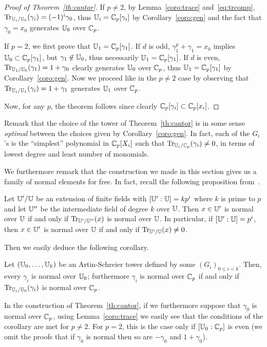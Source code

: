 \begin{proof}[Proof of Theorem~\ref{th:cantor}]
  If $p\ne2$, by Lemma~\ref{coro:trace} and~\ref{eq:trcomp},
  $\operatorname{Tr}_{\mathbb{U}_i/\mathbb{U}_0}(\gamma_i) = (-1)^i\gamma_0$, thus
  $\mathbb{U}_i=\mathbb{C}_p[\gamma_i]$ by Corollary~\ref{coro:gen} and the fact that
  $\gamma_0 = x_0$ generates $\mathbb{U}_0$ over $\mathbb{C}_p$.

  If $p=2$, we first prove that $\mathbb{U}_1=\mathbb{C}_p[\gamma_1]$.  If $d$ is odd,
  $\gamma_1^p + \gamma_1 = x_0$ implies $\mathbb{U}_0\subset\mathbb{C}_p[\gamma_1]$,
  but $\gamma_1\not\in\mathbb{U}_0$, thus necessarily $\mathbb{U}_1=\mathbb{C}_p[\gamma_1]$.
  If $d$ is even, $\operatorname{Tr}_{\mathbb{U}_1/\mathbb{U}_0}(\gamma_1)=1+\gamma_0$ clearly
  generates $\mathbb{U}_0$ over $\mathbb{C}_p$, thus $\mathbb{U}_1=\mathbb{C}_p[\gamma_1]$ by
  Corollary~\ref{coro:gen}. Now we proceed like in the $p\ne2$ case
  by observing that $\operatorname{Tr}_{\mathbb{U}_i/\mathbb{U}_1}(\gamma_i)=1+\gamma_1$ generates
  $\mathbb{U}_1$ over $\mathbb{C}_p$.

  Now, for any $p$, the theorem follows since clearly
  $\mathbb{C}_p[\gamma_i]\subset\mathbb{C}_p[x_i]$.
\end{proof}

Remark that the choice of the tower of Theorem~\ref{th:cantor} is in
some sense \emph{optimal} between the choices given by
Corollary~\ref{coro:gen}. In fact, each of the $G_i$'s is the
``simplest'' polynomial in $\mathbb{C}_p[X_i]$ such that
$\operatorname{Tr}_{\mathbb{U}_i/\mathbb{C}_p}(\gamma_i)\ne0$, in terms of lowest degree and least
number of monomials.

We furthermore remark that the construction we made in this section
gives us a family of normal elements for free. In fact, recall the
following proposition from~\cite[Section 5]{Hach}.
\begin{proposition}
  Let $\mathbb{U}'/\mathbb{U}$ be an extension of finite fields with $[\mathbb{U}':\mathbb{U}]=kp^i$
  where $k$ is prime to $p$ and let $\mathbb{U}''$ be the intermediate field
  of degree $k$ over $\mathbb{U}$. Then $x\in\mathbb{U}'$ is normal over $\mathbb{U}$ if and
  only if $\operatorname{Tr}_{\mathbb{U}'/\mathbb{U}''}(x)$ is normal over $\mathbb{U}$. In particular, if
  $[\mathbb{U}':\mathbb{U}]=p^i$, then $x\in\mathbb{U}'$ is normal over $\mathbb{U}$ if and only if
  $\operatorname{Tr}_{\mathbb{U}'/\mathbb{U}}(x)\ne0$.
\end{proposition}
Then we easily deduce the following corollary.
\begin{corollary}
  Let $(\mathbb{U}_0,\ldots,\mathbb{U}_k)$ be an Artin-Schreier tower defined by some
  $(G_i)_{0\le i<k}$. Then, every $\gamma_i$ is normal over $\mathbb{U}_0$;
  furthermore $\gamma_i$ is normal over $\mathbb{C}_p$ if and only if
  $\operatorname{Tr}_{\mathbb{U}_i/\mathbb{U}_0}(\gamma_i)$ is normal over $\mathbb{C}_p$.
\end{corollary}

In the construction of Theorem~\ref{th:cantor}, if we furthermore
suppose that $\gamma_0$ is normal over $\mathbb{C}_p$, using
Lemma~\ref{coro:trace} we easily see that the conditions of the
corollary are met for $p\ne2$.  For $p=2$, this is the case only if
$[\mathbb{U}_0:\mathbb{C}_p]$ is even (we omit the proofs that if $\gamma_0$ is normal
then so are $-\gamma_0$ and $1+\gamma_0$).

